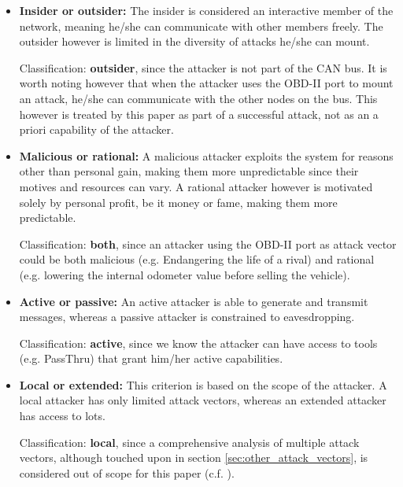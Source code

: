 \begin{itemize}
	\item \textbf{Insider or outsider:} The insider is considered an interactive member of the network, meaning he/she can communicate with other members freely. The outsider however is limited in the diversity of attacks he/she can mount.
	
	Classification: \textbf{outsider}, since the attacker is not part of the CAN bus. It is worth noting however that when the attacker uses the OBD-II port to mount an attack, he/she can communicate with the other nodes on the bus. This however is treated by this paper as part of a successful attack, not as an a priori capability of the attacker.
	
	\item \textbf{Malicious or rational:}  A malicious attacker exploits the system for reasons other than personal gain, making them more unpredictable since their motives and resources can vary. A rational attacker however is motivated solely by personal profit, be it money or fame, making them more predictable.
	
	Classification: \textbf{both}, since an attacker using the OBD-II port as attack vector could be both malicious (e.g. Endangering the life of a rival) and rational (e.g. lowering the internal odometer value before selling the vehicle).
	
	\item \textbf{Active or passive:} An active attacker is able to generate and transmit messages, whereas a passive attacker is constrained to eavesdropping.
	
	Classification: \textbf{active}, since we know the attacker can have access to tools (e.g. PassThru) that grant him/her active capabilities.
	
	\item \textbf{Local or extended:} This criterion is based on the scope of the attacker. A local attacker has only limited attack vectors, whereas an extended attacker has access to lots.
	
	Classification: \textbf{local}, since a comprehensive analysis of multiple attack vectors, although touched upon in section \ref{sec:other_attack_vectors}, is considered out of scope for this paper (c.f. \cite{Pike15,Kleberger15,Russel17,MillerA,Petit,Kosher,Kosher2,Bayer15}).
\end{itemize}

